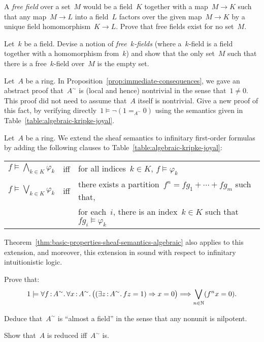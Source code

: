 \documentclass{ws-rv9x6}
\begin{document}
{\begin{exercise}%
\begin{alphlist}[(b)]
\item A \emph{free field} over a set~$M$ would be
a field~$K$ together with a map~$M \to K$ such that any map~$M \to L$ into a
field~$L$ factors
over the given map~$M \to K$ by a unique field homomorphism~$K \to L$. Prove
that free fields exist for no set~$M$.
\item Let~$k$ be a field. Devise a notion of
\emph{free~$k$-fields} (where a~$k$-field is a field together with a
homomorphism from~$k$) and show that the only set~$M$ such that there is a
free~$k$-field over~$M$ is the empty set.
\end{alphlist}
\end{exercise}

\begin{exercise}%
Let~$A$ be a ring. In Proposition~\ref{prop:immediate-consequences}, we gave an
abstract proof that~$A^\sim$ is (local and hence) nontrivial in the sense that~$1
\neq 0$. This proof did not need to assume that~$A$ itself is nontrivial. Give a new proof of this
fact, by verifying directly~$1 \models \neg(1 =_{A^\sim} 0)$ using the
semantics given in Table~\ref{table:algebraic-kripke-joyal}.
\end{exercise}

\begin{exercise}%
\label{ex:gen-field-property}%
Let~$A$ be a ring. We extend the sheaf semantics to infinitary first-order
formulas by adding the following clauses to
Table~\ref{table:algebraic-kripke-joyal}:
\begin{center}\tablefont
\begin{tabular}{@{}l@{\ \ }c@{\ \ }l@{}}
  $f \models \bigwedge_{k \in K} \varphi_k$ &iff&
    for all indices~$k \in K$, $f \models \varphi_k$ \\
  $f \models \bigvee_{k \in K} \varphi_k$ &iff&
    there exists a partition~$f^n = fg_1 + \cdots + fg_m$ such that, \\
  &&\quad for each~$i$, there is an index~$k \in K$ such that~$fg_i \models \varphi_k$
\end{tabular}
\end{center}
Theorem~\ref{thm:basic-properties-sheaf-semantics-algebraic}
also applies to this extension, and moreover, this extension in sound with
respect to infinitary intuitionistic logic.
\begin{alphlist}[(c)]
\item Prove that:
\[ 1 \models \forall f\,{:}\,A^\sim\mathpunct{.} \forall x\,{:}\,A^\sim\mathpunct{.}
  \bigl((\exists z\,{:}\,A^\sim\mathpunct{.} fz = 1) \Rightarrow x = 0\bigr) \Longrightarrow \bigvee_{n \in \mathbb{N}} (f^n x = 0). \]
\item Deduce that~$A^\sim$ is ``almost a field'' in the sense that any nonunit
is nilpotent.
\item Show that~$A$ is reduced iff~$A^\sim$ is.
\end{alphlist}
\end{exercise}

}
\end{document}
